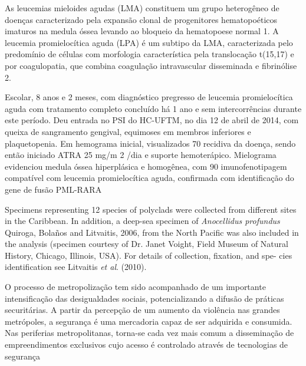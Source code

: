 \begin{multicols}{2}
\par{}As leucemias mieloides agudas (LMA) constituem um
grupo heterogêneo de doenças caracterizado pela expansão
clonal de progenitores hematopoéticos imaturos na medula
óssea levando ao bloqueio da hematopoese normal 1.
A leucemia promielocítica aguda (LPA) é um subtipo da
LMA, caracterizada pelo predomínio de células com morfologia
característica pela translocação t(15,17) e por coagulopatia,
que combina coagulação intravascular disseminada e
fibrinólise 2.


\par{}Escolar, 8 anos e 2 meses, com diagnóstico pregresso
de leucemia promielocítica aguda com tratamento completo
concluído há 1 ano e sem intercorrências durante este período.
Deu entrada no PSI do HC-UFTM, no dia 12 de abril de
2014, com queixa de sangramento gengival, equimoses em
membros inferiores e plaquetopenia. Em hemograma inicial,
visualizados 70%
recidiva da doença, sendo então iniciado ATRA 25 mg/m 2 /dia
e suporte hemoterápico. Mielograma evidenciou medula
óssea hiperplásica e homogênea, com 90%
imunofenotipagem compatível com leucemia promielocítica
aguda, confirmada com identificação do gene de fusão
PML-RARA

\lipsum



\par{}Specimens representing 12 species of polyclads were
collected from different sites in the Caribbean. In addition,
a deep-sea specimen of \textit{Anocellidus profundus} Quiroga,
Bolaños and Litvaitis, 2006, from the North Pacific was
also included in the analysis (specimen courtesy of Dr.
Janet Voight, Field Museum of Natural History, Chicago,
Illinois, USA). For details of collection, fixation, and spe-
cies identification see Litvaitis \textit{et al}. (2010).

\lipsum
{}

\par{}O processo de metropolização tem sido acompanhado
de um importante intensificação das desigualdades sociais, potencializando a difusão de práticas securitárias.
A partir da percepção de um aumento da violência nas
grandes metrópoles, a segurança é uma mercadoria
capaz de ser adquirida e consumida. Nas periferias
metropolitanas, torna-se cada vez mais comum a
disseminação de empreendimentos exclusivos cujo
acesso é controlado através de tecnologias de segurança



\end{multicols}
